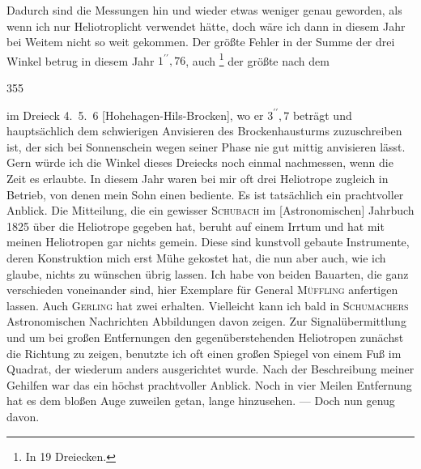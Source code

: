 Dadurch sind die Messungen hin und wieder etwas weniger genau geworden, als wenn ich nur Heliotroplicht verwendet hätte, doch wäre ich dann in diesem Jahr bei Weitem nicht so weit gekommen.
Der größte Fehler in der Summe der drei Winkel betrug in diesem Jahr \(1^{\prime\prime}{,}76\), auch \footnote{In 19 Dreiecken.} der größte nach dem
\par\clearpage
{}\hfill355\par\medskip
\noindent im Dreieck 4.~5.~6 [Hohehagen-Hils-Brocken], wo er \(3^{\prime\prime}{,}7\) beträgt und hauptsächlich dem schwierigen Anvisieren des Brockenhausturms zuzuschreiben ist, der sich bei Sonnenschein wegen seiner Phase nie gut mittig anvisieren lässt.
Gern würde ich die Winkel dieses Dreiecks noch einmal nachmessen, wenn die Zeit es erlaubte.
In diesem Jahr waren bei mir oft drei Heliotrope zugleich in Betrieb, von denen mein Sohn einen bediente. Es ist tatsächlich ein prachtvoller Anblick.
Die Mitteilung, die ein gewisser \textsc{Schubach} im [Astronomischen] Jahrbuch 1825 über die Heliotrope gegeben hat, beruht auf einem Irrtum und hat mit meinen Heliotropen gar nichts gemein. Diese sind kunstvoll gebaute Instrumente, deren Konstruktion mich erst  Mühe gekostet hat, die nun aber auch, wie ich glaube, nichts zu wünschen übrig lassen.
Ich habe von beiden Bauarten, die ganz verschieden voneinander sind, hier Exemplare für General \textsc{Müffling} anfertigen lassen. Auch \textsc{Gerling} hat zwei erhalten. Vielleicht kann ich bald in \textsc{Schumachers} Astronomischen Nachrichten Abbildungen davon zeigen.
Zur Signalübermittlung und um bei großen Entfernungen den gegenüberstehenden Heliotropen zunächst die Richtung zu zeigen, benutzte ich oft einen großen Spiegel von einem Fuß im Quadrat, der wiederum anders ausgerichtet wurde.
Nach der Beschreibung meiner Gehilfen war das ein höchst prachtvoller Anblick. Noch in vier Meilen Entfernung hat es dem bloßen Auge zuweilen getan, lange hinzusehen. --- Doch nun genug davon.


